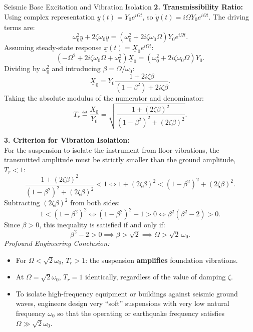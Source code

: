 \begin{workedexample}{Seismic Base Excitation and Vibration Isolation}
\textbf{2. Transmissibility Ratio:}\\
Using complex representation $\underline{y}(t) = Y_0 e^{i\Omega t}$, so $\dot{\underline{y}}(t) = i\Omega Y_0 e^{i\Omega t}$. The driving terms are:
\[
\omega_0^2 \underline{y} + 2\zeta\omega_0 \dot{\underline{y}} = (\omega_0^2 + 2i\zeta\omega_0\Omega) Y_0 e^{i\Omega t}.
\]
Assuming steady-state response $\underline{x}(t) = \underline{X}_0 e^{i\Omega t}$:
\[
\left( -\Omega^2 + 2i\zeta\omega_0\Omega + \omega_0^2 \right) \underline{X}_0 = (\omega_0^2 + 2i\zeta\omega_0\Omega) Y_0.
\]
Dividing by $\omega_0^2$ and introducing $\beta = \Omega/\omega_0$:
\[
\underline{X}_0 = Y_0 \frac{1 + 2i\zeta\beta}{(1 - \beta^2) + 2i\zeta\beta}.
\]
Taking the absolute modulus of the numerator and denominator:
\[
T_r \eqdef \frac{X_0}{Y_0} = \sqrt{\frac{1 + (2\zeta\beta)^2}{(1 - \beta^2)^2 + (2\zeta\beta)^2}}.
\]

\textbf{3. Criterion for Vibration Isolation:}\\
For the suspension to isolate the instrument from floor vibrations, the transmitted amplitude must be strictly smaller than the ground amplitude, $T_r < 1$:
\[
\frac{1 + (2\zeta\beta)^2}{(1 - \beta^2)^2 + (2\zeta\beta)^2} < 1 \iff 1 + (2\zeta\beta)^2 < (1 - \beta^2)^2 + (2\zeta\beta)^2.
\]
Subtracting $(2\zeta\beta)^2$ from both sides:
\[
1 < (1 - \beta^2)^2 \iff (1 - \beta^2)^2 - 1 > 0 \iff \beta^2(\beta^2 - 2) > 0.
\]
Since $\beta > 0$, this inequality is satisfied if and only if:
\[
\beta^2 - 2 > 0 \implies \beta > \sqrt{2} \implies \Omega > \sqrt{2}\,\omega_0.
\]
\emph{Profound Engineering Conclusion:}
\begin{itemize}[leftmargin=1.5em,itemsep=2pt]
  \item For $\Omega < \sqrt{2}\omega_0$, $T_r > 1$: the suspension \textbf{amplifies} foundation vibrations.
  \item At $\Omega = \sqrt{2}\omega_0$, $T_r = 1$ identically, regardless of the value of damping $\zeta$.
  \item To isolate high-frequency equipment or buildings against seismic ground waves, engineers design very ``soft'' suspensions with very low natural frequency $\omega_0$ so that the operating or earthquake frequency satisfies $\Omega \gg \sqrt{2}\omega_0$.
\end{itemize}
\end{workedexample}

